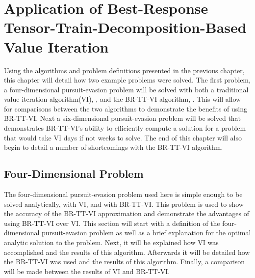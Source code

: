 \chapter{Application of Best-Response Tensor-Train-Decomposition-Based Value Iteration}\label{chp:examples}
Using the algorithms and problem definitions presented in the previous chapter, this chapter will detail how two example problems were solved. The first problem, a four-dimensional pursuit-evasion problem will be solved with both a traditional value iteration algorithm(VI), , and the BR-TT-VI algorithm, . This will allow for comparisons between the two algorithms to demonstrate the benefits of using BR-TT-VI. Next a six-dimensional pursuit-evasion problem will be solved that demonstrates BR-TT-VI's ability to efficiently compute a solution for a problem that would take VI days if not weeks to solve. The end of this chapter will also begin to detail a number of shortcomings with the BR-TT-VI algorithm.  

\section{Four-Dimensional Problem}
The four-dimensional pursuit-evasion problem used here is simple enough to be solved analytically, with VI, and with BR-TT-VI. This problem is used to show the accuracy of the BR-TT-VI approximation and demonstrate the advantages of using BR-TT-VI over VI. This section will start with a definition of the four-dimensional pursuit-evasion problem as well as a brief explanation for the optimal analytic solution to the problem. Next, it will be explained how VI was accomplished and the results of this algorithm. Afterwards it will be detailed how the BR-TT-VI was used and the results of this algorithm. Finally, a comparison will be made between the results of VI and BR-TT-VI.   
